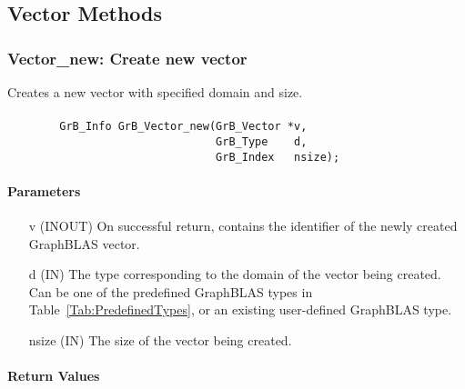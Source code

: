\subsection{Vector Methods}



\subsubsection{{\sf Vector\_new}: Create new vector}

Creates a new vector with specified domain and size.

\paragraph{\syntax}

\begin{verbatim}
        GrB_Info GrB_Vector_new(GrB_Vector *v,
                                GrB_Type    d,
                                GrB_Index   nsize);
\end{verbatim}

\paragraph{Parameters}

\begin{itemize}[leftmargin=1.1in]
    \item[{\sf v}] ({\sf INOUT}) On successful return, contains the identifier 
                                 of the newly created GraphBLAS vector.
    \item[{\sf d}] ({\sf IN})    The type corresponding to the domain of the 
                                 vector being created.  Can be one of the 
                                 predefined GraphBLAS types in 
                                 Table~\ref{Tab:PredefinedTypes}, or an existing 
                                 user-defined GraphBLAS type.
    \item[{\sf nsize}] ({\sf IN}) The size of the vector being created.
\end{itemize}

\paragraph{Return Values}

